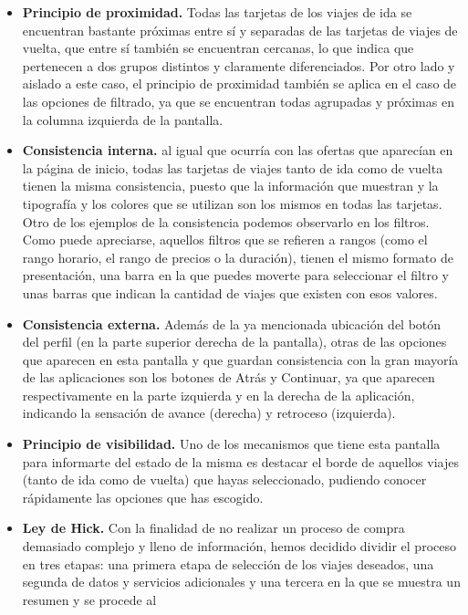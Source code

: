 \begin{itemize}
    \item \textbf{Principio de proximidad.} Todas las tarjetas de los viajes de ida se encuentran bastante próximas entre
        sí y separadas de las tarjetas de viajes de vuelta, que entre sí también se encuentran cercanas, lo que
        indica que pertenecen a dos grupos distintos y claramente diferenciados. Por otro lado y aislado a este caso,
        el principio de proximidad también se aplica en el caso de las opciones de filtrado, ya que se encuentran
        todas agrupadas y próximas en la columna izquierda de la pantalla.
    \item \textbf{Consistencia interna.} al igual que ocurría con las ofertas que aparecían en la página de inicio, todas
        las tarjetas de viajes tanto de ida como de vuelta tienen la misma consistencia, puesto que la información
        que muestran y la tipografía y los colores que se utilizan son los mismos en todas las tarjetas. Otro de los
        ejemplos de la consistencia podemos observarlo en los filtros. Como puede apreciarse, aquellos filtros que se
        refieren a rangos (como el rango horario, el rango de precios o la duración), tienen el mismo formato de
        presentación, una barra en la que puedes moverte para seleccionar el filtro y unas barras que indican la
        cantidad de viajes que existen con esos valores.
    \item \textbf{Consistencia externa.} Además de la ya mencionada ubicación del botón del perfil (en la parte
        superior derecha de la pantalla), otras de las opciones que aparecen en esta pantalla y que guardan
        consistencia con la gran mayoría de las aplicaciones son los botones de Atrás y Continuar, ya que aparecen
        respectivamente en la parte izquierda y en la derecha de la aplicación, indicando la sensación de avance
        (derecha) y retroceso (izquierda).
    \item \textbf{Principio de visibilidad.} Uno de los mecanismos que tiene esta pantalla para informarte del estado de la
        misma es destacar el borde de aquellos viajes (tanto de ida como de vuelta) que hayas seleccionado, pudiendo
        conocer rápidamente las opciones que has escogido.
    \item \textbf{Ley de Hick.} Con la finalidad de no realizar un proceso de compra demasiado complejo y lleno de información,
        hemos decidido dividir el proceso en tres etapas: una primera etapa de selección de los viajes deseados,
        una segunda de datos y servicios adicionales y una tercera en la que se muestra un resumen y se procede al

\end{itemize}
